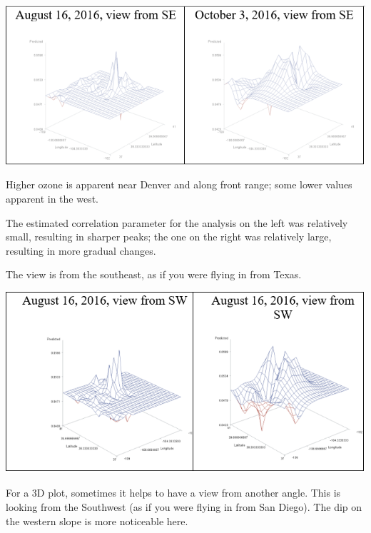 \documentclass[
  9pt,
  ignorenonframetext,
]{beamer}
\begin{document}
\begin{frame}{}
\protect\hypertarget{section-12}{}
\begin{center}\includegraphics[width=0.7\linewidth]{figs_L22/f4} \end{center}

Higher ozone is apparent near Denver and along front range; some lower
values apparent in the west.

The estimated correlation parameter for the analysis on the left was
relatively small, resulting in sharper peaks; the one on the right was
relatively large, resulting in more gradual changes.

The view is from the southeast, as if you were flying in from Texas.
\end{frame}

\begin{frame}{}
\protect\hypertarget{section-13}{}
\begin{center}\includegraphics[width=0.7\linewidth]{figs_L22/f5} \end{center}

For a 3D plot, sometimes it helps to have a view from another angle.
This is looking from the Southwest (as if you were flying in from San
Diego). The dip on the western slope is more noticeable here.
\end{frame}
\end{document}

